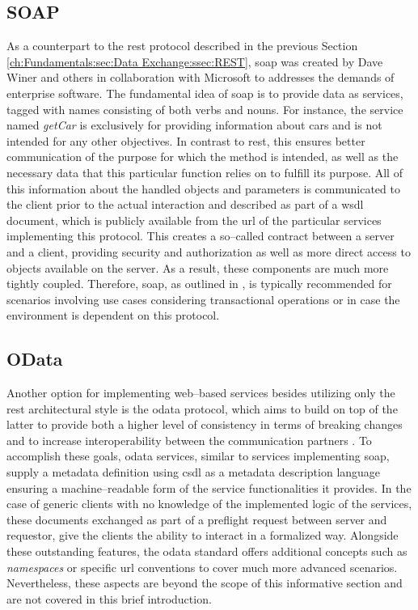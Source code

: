 \subsection{SOAP}
\label{ch:Fundamentals:sec:Data Exchange:ssec:SOAP}

As a counterpart to the \acrshort{rest} protocol described in the previous Section \ref{ch:Fundamentals:sec:Data Exchange:ssec:REST}, \acrshort{soap} was created by Dave Winer and others in collaboration with Microsoft \cite{patni_pro_2017} to addresses the demands of enterprise software.
The fundamental idea of \acrshort{soap} is to provide data as services, tagged with names consisting of both verbs and nouns. For instance, the service named \textit{getCar} is exclusively for providing information about cars and is not intended for any other objectives.
In contrast to \acrshort{rest}, this ensures better communication of the purpose for which the method is intended, as well as the necessary data that this particular function relies on to fulfill its purpose. All of this information about the handled objects and parameters is communicated to the client prior to the actual interaction and described as part of a \acrfull{wsdl} document, which is publicly available from the \acrshort{url} of the particular services implementing this protocol.
This creates a so--called contract between a server and a client, providing security and authorization as well as more direct access to objects available on the server. As a result, these components are much more tightly coupled.
Therefore, \acrshort{soap}, as outlined in \cite[4]{patni_pro_2017}, is typically recommended for scenarios involving use cases considering transactional operations or in case the environment is dependent on this protocol.

\subsection{OData}
\label{ch:Fundamentals:sec:Data Exchange:ssec:OData}

Another option for implementing web--based services besides utilizing only the \acrshort{rest} architectural style is the \acrshort{odata} protocol, which aims to build on top of the latter to provide both a higher level of consistency in terms of breaking changes and to increase interoperability between the communication partners \cite{noauthor_documentation_nodate}.
To accomplish these goals, \acrshort{odata} services, similar to services implementing \acrshort{soap}, supply a metadata definition using \acrfull{csdl} as a metadata description language ensuring a machine--readable form of the service functionalities it provides.
In the case of generic clients with no knowledge of the implemented logic of the services, these documents exchanged as part of a preflight request between server and requestor, give the clients the ability to interact in a formalized way.
Alongside these outstanding features, the \acrshort{odata} standard offers additional concepts such as \textit{namespaces} or specific \acrshort{url} conventions to cover much more advanced scenarios. 
Nevertheless, these aspects are beyond the scope of this informative section and are not covered in this brief introduction.

